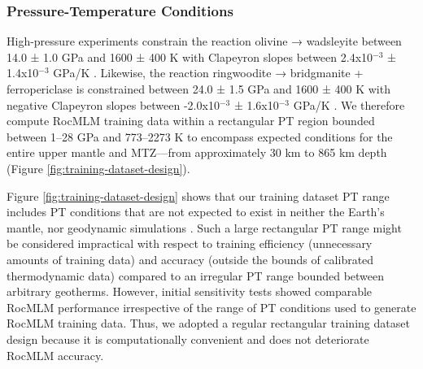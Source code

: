 \documentclass[draft,linenumbers]{agujournal2018}
\begin{document}
\subsubsection{Pressure-Temperature Conditions}\label{sec:pt-conditions}

High-pressure experiments constrain the reaction olivine → wadsleyite between 14.0 ± 1.0 GPa and 1600 ± 400 K with Clapeyron slopes between 2.4x10\(^{−3}\) ± 1.4x10\(^{−3}\) GPa/K \citep{akaogi1989, katsura1989, li2019, morishima1994}. Likewise, the reaction ringwoodite → bridgmanite + ferropericlase is constrained between 24.0 ± 1.5 GPa and 1600 ± 400 K with negative Clapeyron slopes between -2.0x10\(^{−3}\) ± 1.6x10\(^{−3}\) GPa/K \citep{akaogi2007, bina1994, hirose2002, ishii2018, ito1982, ito1990, ito1989a, ito1989b, katsura2003, litasov2005}. We therefore compute RocMLM training data within a rectangular PT region bounded between 1--28 GPa and 773--2273 K to encompass expected conditions for the entire upper mantle and MTZ---from approximately 30 km to 865 km depth (Figure \ref{fig:training-dataset-design}).

Figure \ref{fig:training-dataset-design} shows that our training dataset PT range includes PT conditions that are not expected to exist in neither the Earth's mantle, nor geodynamic simulations \citep[e.g., very cold conditions with thermal gradients ≤ 5 K/km,][]{cerpa2022, maruyama1996, syracuse2010}. Such a large rectangular PT range might be considered impractical with respect to training efficiency (unnecessary amounts of training data) and accuracy (outside the bounds of calibrated thermodynamic data) compared to an irregular PT range bounded between arbitrary geotherms. However, initial sensitivity tests showed comparable RocMLM performance irrespective of the range of PT conditions used to generate RocMLM training data. Thus, we adopted a regular rectangular training dataset design because it is computationally convenient and does not deteriorate RocMLM accuracy.
\end{document}
